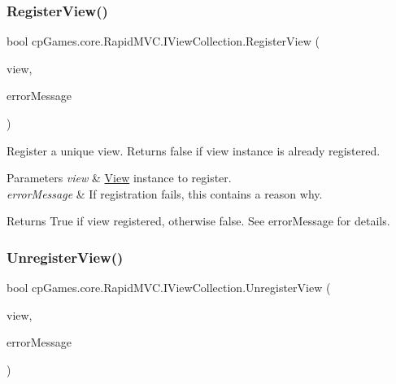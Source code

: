 \subsubsection{\texorpdfstring{RegisterView()}{RegisterView()}}
{\footnotesize\ttfamily bool cp\+Games.\+core.\+Rapid\+M\+V\+C.\+I\+View\+Collection.\+Register\+View (\begin{DoxyParamCaption}\item[{\mbox{\hyperlink{interfacecp_games_1_1core_1_1_rapid_m_v_c_1_1_i_view}{I\+View}}}]{view,  }\item[{out string}]{error\+Message }\end{DoxyParamCaption})}



Register a unique view. Returns false if view instance is already registered. 


\begin{DoxyParams}{Parameters}
{\em view} & \mbox{\hyperlink{classcp_games_1_1core_1_1_rapid_m_v_c_1_1_view}{View}} instance to register.\\
\hline
{\em error\+Message} & If registration fails, this contains a reason why.\\
\hline
\end{DoxyParams}
\begin{DoxyReturn}{Returns}
True if view registered, otherwise false. See error\+Message for details.
\end{DoxyReturn}
\mbox{\label{interfacecp_games_1_1core_1_1_rapid_m_v_c_1_1_i_view_collection_acc10b801eec02af0165b9e558a915682}} 
\subsubsection{\texorpdfstring{UnregisterView()}{UnregisterView()}}
{\footnotesize\ttfamily bool cp\+Games.\+core.\+Rapid\+M\+V\+C.\+I\+View\+Collection.\+Unregister\+View (\begin{DoxyParamCaption}\item[{\mbox{\hyperlink{interfacecp_games_1_1core_1_1_rapid_m_v_c_1_1_i_view}{I\+View}}}]{view,  }\item[{out string}]{error\+Message }\end{DoxyParamCaption})}




